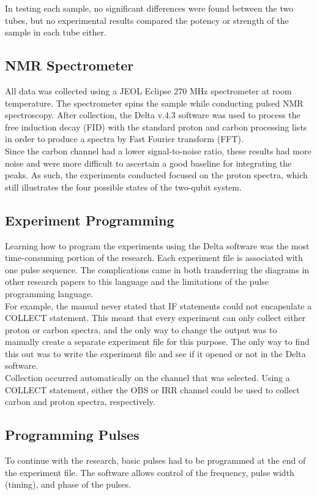 \documentclass[11pt]{article}
\begin{document}
\begin{multicols}{2}
In testing each sample, no significant differences were found between the two tubes, but no experimental results compared the potency or strength of the sample in each tube either.

  \subsection{NMR Spectrometer}
  All data was collected using a JEOL Eclipse 270 MHz spectrometer at room temperature. The spectrometer spins the sample while conducting pulsed NMR spectroscopy. After collection, the Delta v.4.3 software was used to process the free induction decay (FID) with the standard proton and carbon processing lists in order to produce a spectra by Fast Fourier transform (FFT). \\

Since the carbon channel had a lower signal-to-noise ratio, these results had more noise and were more difficult to ascertain a good baseline for integrating the peaks. As such, the experiments conducted focused on the proton spectra, which still illustrates the four possible states of the two-qubit system.

  \subsection{Experiment Programming}
  Learning how to program the experiments using the Delta software was the most time-consuming portion of the research. Each experiment file is associated with one pulse sequence. The complications came in both transferring the diagrams in other research papers to this language and the limitations of the pulse programming language. \\

For example, the manual never stated that IF statements could not encapsulate a COLLECT statement. This meant that every experiment can only collect either proton or carbon spectra, and the only way to change the output was to manually create a separate experiment file for this purpose. The only way to find this out was to write the experiment file and see if it opened or not in the Delta software. \\

Collection occurred automatically on the channel that was selected. Using a COLLECT statement, either the OBS or IRR channel could be used to collect carbon and proton spectra, respectively.

  \subsection{Programming Pulses}
  To continue with the research, basic pulses had to be programmed at the end of the experiment file. The software allows control of the frequency, pulse width (timing), and phase of the pulses. \\


\end{multicols}
\end{document}
